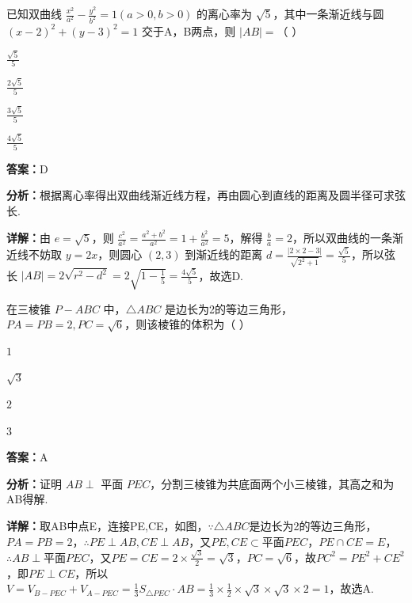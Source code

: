 \begin{question}[points=5]
已知双曲线 $\frac{x^2}{a^2}-\frac{y^2}{b^2}=1(a>0,b>0)$ 的离心率为 $\sqrt{5}$，其中一条渐近线与圆 $(x-2)^2+(y-3)^2=1$ 交于A，B两点，则 $|AB| =$（    ）
\begin{choices}
  \item $\frac{\sqrt{5}}{5}$
  \item $\frac{2\sqrt{5}}{5}$
  \item $\frac{3\sqrt{5}}{5}$
  \item $\frac{4\sqrt{5}}{5}$
\end{choices}
\begin{solution}
\textbf{答案：}D

\textbf{分析：}根据离心率得出双曲线渐近线方程，再由圆心到直线的距离及圆半径可求弦长.

\textbf{详解：}由 $e=\sqrt{5}$，则 $\frac{c^2}{a^2}= \frac{a^2+b^2}{a^2}=1+\frac{b^2}{a^2}=5$，解得 $\frac{b}{a}=2$，所以双曲线的一条渐近线不妨取 $y=2x$，则圆心 $(2,3)$ 到渐近线的距离 $d = \frac{|2\times2-3|}{\sqrt{2^2+1}} = \frac{\sqrt{5}}{5}$，所以弦长 $|AB| = 2\sqrt{r^2-d^2} = 2\sqrt{1-\frac{1}{5}} = \frac{4\sqrt{5}}{5}$，故选D.
\end{solution}
\end{question}

\begin{question}[points=5]
在三棱锥 $P-ABC$ 中，$\triangle ABC$ 是边长为2的等边三角形，$PA=PB=2, PC=\sqrt{6}$，则该棱锥的体积为（    ）
\begin{choices}
  \item $1$
  \item $\sqrt{3}$
  \item $2$
  \item $3$
\end{choices}
\begin{solution}
\textbf{答案：}A

\textbf{分析：}证明 $AB \perp$ 平面 $PEC$，分割三棱锥为共底面两个小三棱锥，其高之和为AB得解.

\textbf{详解：}取AB中点E，连接PE,CE，如图，$\because \triangle ABC$是边长为2的等边三角形，$PA=PB=2$，$\therefore PE \perp AB, CE \perp AB$，又$PE, CE \subset$平面$PEC$，$PE \cap CE = E$，$\therefore AB \perp$平面$PEC$，又$PE=CE=2\times\frac{\sqrt{3}}{2}=\sqrt{3}$，$PC=\sqrt{6}$，故$PC^2=PE^2+CE^2$，即$PE \perp CE$，所以$V=V_{B-PEC}+V_{A-PEC}=\frac{1}{3}S_{\triangle PEC}\cdot AB = \frac{1}{3}\times\frac{1}{2}\times\sqrt{3}\times\sqrt{3}\times2=1$，故选A.
\end{solution}
\end{question}

